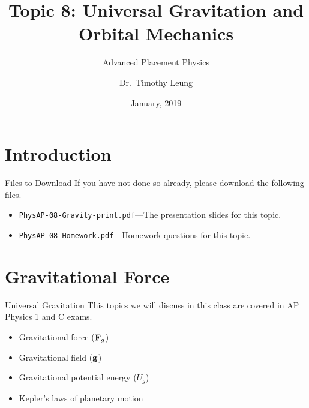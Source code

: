 \documentclass[12pt,compress,aspectratio=169]{beamer}
\title{Topic 8: Universal Gravitation and Orbital Mechanics}
\subtitle{Advanced Placement Physics}
\author{Dr.\ Timothy Leung}
\institute{Olympiads School, Toronto, ON, Canada}
\date{January, 2019}
\newcommand{\mb}[1]{\ensuremath\mathbf{#1}}
\begin{document}
\begin{frame}
  \maketitle
\end{frame}


\section[Intro]{Introduction}

\begin{frame}{Files to Download}
  If you have not done so already, please download the following files.
  \begin{itemize}
  \item\texttt{PhysAP-08-Gravity-print.pdf}---The presentation slides for this
    topic.
  \item\texttt{PhysAP-08-Homework.pdf}---Homework questions for this topic.
  \end{itemize}
\end{frame}



\section{Gravitational Force}

\begin{frame}{Universal Gravitation}
  This topics we will discuss in this class are covered in AP Physics 1 and
  C exams.
  \begin{itemize}
  \item Gravitational force ($\mb{F}_g$)
  \item Gravitational field ($\mb{g}$)
  \item Gravitational potential energy  ($U_g$)
  \item Kepler's laws of planetary motion
  \end{itemize}
\end{frame}
\end{document}
